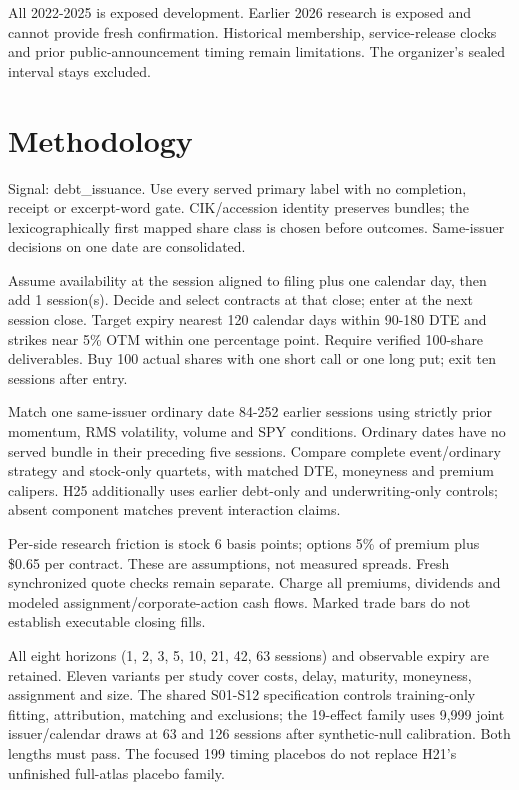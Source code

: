 \documentclass[11pt,letterpaper]{article}
\begin{document}
All 2022-2025 is exposed development. Earlier 2026 research is exposed and cannot provide fresh confirmation. Historical membership, service-release clocks and prior public-announcement timing remain limitations. The organizer's sealed interval stays excluded.


\clearpage
\section{Methodology}
Signal: debt\_issuance. Use every served primary label with no completion, receipt or excerpt-word gate. CIK/accession identity preserves bundles; the lexicographically first mapped share class is chosen before outcomes. Same-issuer decisions on one date are consolidated.

Assume availability at the session aligned to filing plus one calendar day, then add 1 session(s). Decide and select contracts at that close; enter at the next session close. Target expiry nearest 120 calendar days within 90-180 DTE and strikes near 5\% OTM within one percentage point. Require verified 100-share deliverables. Buy 100 actual shares with one short call or one long put; exit ten sessions after entry.

Match one same-issuer ordinary date 84-252 earlier sessions using strictly prior momentum, RMS volatility, volume and SPY conditions. Ordinary dates have no served bundle in their preceding five sessions. Compare complete event/ordinary strategy and stock-only quartets, with matched DTE, moneyness and premium calipers. H25 additionally uses earlier debt-only and underwriting-only controls; absent component matches prevent interaction claims.

Per-side research friction is stock 6 basis points; options 5\% of premium plus \$0.65 per contract. These are assumptions, not measured spreads. Fresh synchronized quote checks remain separate. Charge all premiums, dividends and modeled assignment/corporate-action cash flows. Marked trade bars do not establish executable closing fills.

All eight horizons (1, 2, 3, 5, 10, 21, 42, 63 sessions) and observable expiry are retained. Eleven variants per study cover costs, delay, maturity, moneyness, assignment and size. The shared S01-S12 specification controls training-only fitting, attribution, matching and exclusions; the 19-effect family uses 9,999 joint issuer/calendar draws at 63 and 126 sessions after synthetic-null calibration. Both lengths must pass. The focused 199 timing placebos do not replace H21's unfinished full-atlas placebo family.
\end{document}
